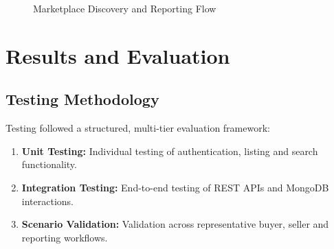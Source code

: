 \documentclass[12pt,a4paper,oneside]{report}
\begin{document}
\begin{figure}[H]

\caption{Marketplace Discovery and Reporting Flow}

\end{figure}


\chapter{Results and Evaluation}

\section{Testing Methodology}

Testing followed a structured, multi-tier evaluation framework:

\begin{enumerate}

\item \textbf{Unit Testing:}
Individual testing of authentication, listing and search functionality.

\item \textbf{Integration Testing:}
End-to-end testing of REST APIs and MongoDB interactions.

\item \textbf{Scenario Validation:}
Validation across representative buyer, seller and reporting workflows.

\end{enumerate}
\end{document}
